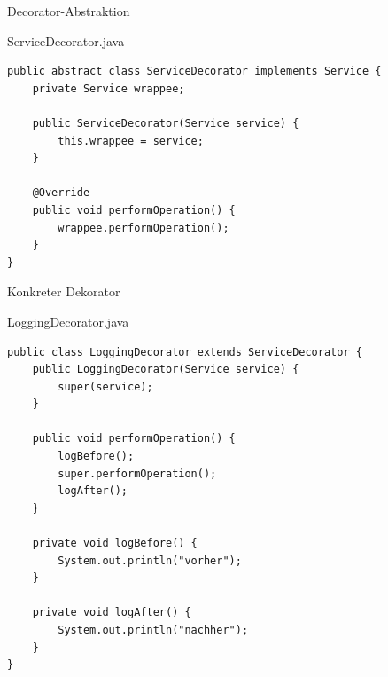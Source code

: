 \begin{frame}[fragile]{Decorator-Abstraktion}
	\begin{exampleblock}{ServiceDecorator.java}
        \begin{lstlisting}
public abstract class ServiceDecorator implements Service {
    private Service wrappee;

    public ServiceDecorator(Service service) {
        this.wrappee = service;
    }

    @Override
    public void performOperation() {
        wrappee.performOperation();
    }
}
        \end{lstlisting}
	\end{exampleblock}
\end{frame}

\begin{frame}[fragile]{Konkreter Dekorator}
	\begin{exampleblock}{LoggingDecorator.java}
        \begin{lstlisting}
public class LoggingDecorator extends ServiceDecorator {
    public LoggingDecorator(Service service) {
        super(service);
    }

    public void performOperation() {
        logBefore();
        super.performOperation();
        logAfter();
    }

    private void logBefore() {
        System.out.println("vorher");
    }

    private void logAfter() {
        System.out.println("nachher");
    }
}
        \end{lstlisting}
	\end{exampleblock}
\end{frame}
